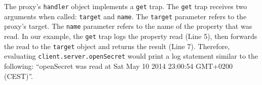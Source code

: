 The proxy's \lstinline{handler} object implements a \lstinline{get} trap.
The \lstinline{get} trap receives two arguments when called: \lstinline{target} and \lstinline{name}.
The \lstinline{target} parameter refers to the proxy's target.
The \lstinline{name} parameter refers to the name of the property that was read.
In our example, the \lstinline{get} trap logs the property read (Line 5), then forwards the read to the \lstinline{target} object and returns the result (Line 7).
Therefore, evaluating \lstinline{client.server.openSecret} would print a log statement similar to the following: ``openSecret was read at Sat May 10 2014 23:00:54 GMT+0200 (CEST)''.







    




